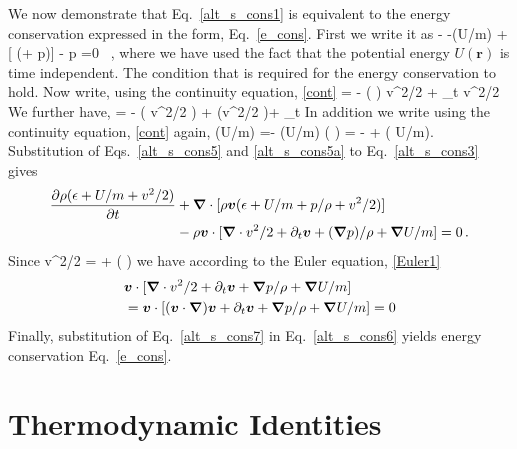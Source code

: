 We now demonstrate that Eq.~\eqref{alt_s_cons1} is equivalent to the energy conservation expressed in the form, Eq.~\eqref{e_cons}.
First we write it as
\be\label{alt_s_cons3}
 - 
 -(U/m)
  + \bm{\nabla} [ (\rho \epsilon + p)] - \bm{\nabla} p \cdot  {} =0 \, ,
\ee
where we have used the fact that the potential energy $U(\bm{r})$ is time independent.
The condition that is required for the energy conservation to hold. 
Now write, using the continuity equation, \eqref{cont} 
\be\label{alt_s_cons4}
 =
- \bm{\nabla}\cdot ( \rho {} ) v^2/2 + \rho \partial_t v^2/2
\ee
We further have,
\be\label{alt_s_cons5}
 =
- \bm{\nabla}\cdot ( \rho {}  v^2/2 ) +    \rho {} \cdot \bm{\nabla}(v^2/2 )+ \rho {} \cdot \partial_t 
\ee
In addition we write using the continuity equation, \eqref{cont} again,
\be\label{alt_s_cons5a}
(U/m) =- (U/m) \bm{\nabla} \cdot (\rho {} ) = -\bm{\nabla} \cdot [ (U/m) \rho \bm{v} ] + \rho {} \cdot \bm{\nabla}  ( U/m).
\ee
Substitution of Eqs.~\eqref{alt_s_cons5} and \eqref{alt_s_cons5a} to Eq.~\eqref{alt_s_cons3} gives
\begin{align}\label{alt_s_cons6}
 \frac{\partial \rho (\epsilon + U/m + v^2/2)}{\partial t } &
 + \bm{\nabla}\cdot [ \rho \bm{v} (\epsilon + U/m+ p/\rho + v^2/2 ) ] 
 \notag \\
& -   \rho \bm{v} \cdot 
 [ 
 \bm{\nabla} \cdot v^2/2 + \partial_t \bm{v}
+ (\bm{\nabla} p)/\rho + \bm{\nabla} U/m] =0 \, .
\end{align}
Since 
\be\label{vi}
 \bm{\nabla} \cdot v^2/2 =   + ( \cdot \bm{\nabla }) 
\ee
we have according to the Euler equation, \eqref{Euler1}
\begin{align}\label{alt_s_cons7}
& \bm{v} \cdot 
 [ 
 \bm{\nabla} \cdot v^2/2 + \partial_t \bm{v}
+ \bm{\nabla} p/\rho+ \bm{\nabla} U/m] 
\notag \\
& =
\bm{v} \cdot 
 [ 
 (\bm{v} \cdot \bm{\nabla }) \bm{v} + \partial_t \bm{v}
+ \bm{\nabla} p/\rho + \bm{\nabla} U/m] = 0
\end{align}
Finally, substitution of Eq.~\eqref{alt_s_cons7} in Eq.~\eqref{alt_s_cons6} yields energy conservation Eq.~\eqref{e_cons}.

\section{Thermodynamic Identities}
\label{app:FL_s}



